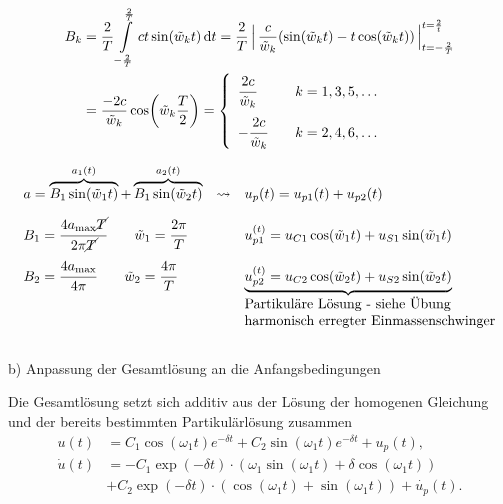 \begin{solution}
\begin{align*}
     B_k &= \frac{2}{T} \int\limits_{-\frac{2}{T}}^{\frac{2}{T}} ct \sin(\tilde{w}_k t) \dd{t} = \frac{2}{T}\,\Big|\, \frac{c}{\tilde{w}_k}(\sin(\tilde{w}_k t)-t\cos(\tilde{w}_k t))\,\Big|_{t={-\frac{2}{T}}}^{t=\frac{2}{t}} \\
     &= \frac{-2c}{\tilde{w}_k} \cos(\tilde{w}_k\frac{T}{2}) =
     \left\{
     \begin{array}{lll}
     \cfrac{2c}{\tilde{w}_k} & &k = 1,3,5,\dots\\[1em]
     -\cfrac{2c}{\tilde{w}_k} & &k = 2,4,6,\dots
     \end{array}\right.
\end{align*}

\begin{align*}
     \begin{array}{lcl}
        a = \overbrace{B_1\sin(\tilde{w}_1 t)}^{a_1(t)} + \overbrace{B_1\sin(\tilde{w}_2 t)}^{a_2(t)} & \rightsquigarrow & u_p(t) = u_{p1}(t) + u_{p2}(t) \\[1em]
        B_1 = \cfrac{4a_{\max}\cancel{T}}{2\pi\cancel{T}} \qquad \tilde{w}_1 = \cfrac{2\pi}{T} && u_{p1}^{(t)} = u_{C1} \cos(\tilde{w}_1 t) + u_{S1} \sin(\tilde{w}_1 t) \\[1em]
        B_2 = \cfrac{4a_{\max}}{4\pi} \qquad \tilde{w}_2 = \cfrac{4\pi}{T}&& \underbrace{u_{p2}^{(t)} = u_{C2} \cos(\tilde{w}_2 t) + u_{S2} \sin(\tilde{w}_2 t)} \\
        &&\text{Partikuläre Lösung - siehe Übung}\\
        &&\text{harmonisch erregter Einmassenschwinger}
    \end{array}
\end{align*}\\[2em]

b) Anpassung der Gesamtlösung an die Anfangsbedingungen
    
    Die Gesamtlösung setzt sich additiv aus der Lösung der homogenen Gleichung und der bereits bestimmten Partikulärlösung zusammen
    \begin{align*}
        u(t) &= C_1\cos(\omega_1 t)e^{-\delta t} + C_2 \sin(\omega_1 t)e^{-\delta t} + u_p(t),\\
        \dot{u}(t) &= -C_1 \exp(-\delta t) \cdot (\omega_1 \sin(\omega_1 t) + \delta \cos(\omega_1 t)) \\ 
        &+ C_2 \exp(-\delta t) \cdot (\cos(\omega_1 t) + \sin(\omega_1 t)) + \dot{u_p}(t).\\
    \end{align*}


\end{solution}
